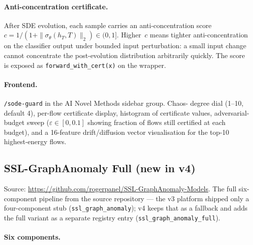 \documentclass[11pt,a4paper]{article}
\begin{document}
\paragraph{Anti-concentration certificate.}
After SDE evolution, each sample carries an anti-concentration
score~\(c = 1 / (1 + \|\sigma_\theta(h_T, T)\|_2) \in (0, 1]\).
Higher~\(c\) means tighter anti-concentration on the classifier output
under bounded input perturbation: a small input change cannot
concentrate the post-evolution distribution arbitrarily quickly.
The score is exposed as \texttt{forward\_with\_cert(x)} on the
wrapper.

\paragraph{Frontend.}
\texttt{/sode-guard} in the AI Novel Methods sidebar group.  Chaos-
degree dial (1--10, default 4), per-flow certificate display,
histogram of certificate values, adversarial-budget sweep
(\(\varepsilon \in [0, 0.1]\) showing fraction of flows still
certified at each budget), and a 16-feature drift/diffusion vector
visualisation for the top-10 highest-energy flows.

\subsection{SSL-GraphAnomaly Full (new in v4)}
\label{sec:ssl_graph_anomaly_full}

Source: \url{https://github.com/rogerpanel/SSL-GraphAnomaly-Models}.
The full six-component pipeline from the source repository --- the
v3 platform shipped only a four-component stub
(\texttt{ssl\_graph\_anomaly}); v4 keeps that as a fallback and adds
the full variant as a separate registry entry
(\texttt{ssl\_graph\_anomaly\_full}).

\paragraph{Six components.}
\end{document}
